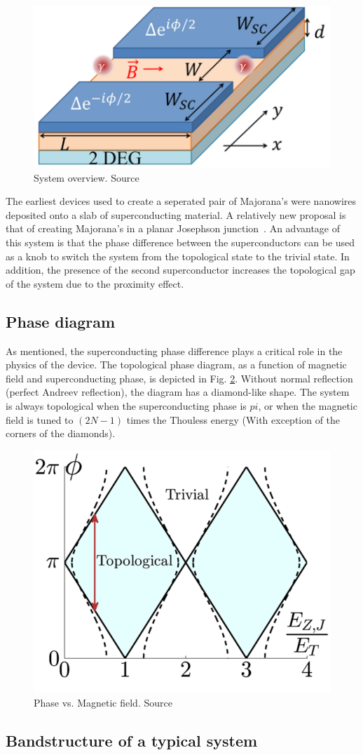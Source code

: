 	\begin{figure}[!htb]
	\centering
	\includegraphics[width=0.5\columnwidth]{figures/pientka_system}
	\caption{System overview. Source\cite{pientka_topological_2017}}
	\label{fig:pientka_system}
	\end{figure}

	The earliest devices used to create a seperated pair of Majorana's were nanowires deposited onto a slab of superconducting material.
	A relatively new proposal is that of creating Majorana's in a planar Josephson junction~\cite{pientka_topological_2017}.
	An advantage of this system is that the phase difference between the superconductors can be used as a knob to switch the system from the topological state to the trivial state. 
	In addition, the presence of the second superconductor increases the topological gap of the system due to the proximity effect.

			

	\subsection{Phase diagram}
		As mentioned, the superconducting phase difference plays a critical role in the physics of the device.
		The topological phase diagram, as a function of magnetic field and superconducting phase, is depicted in Fig. \ref{fig:pientka_phase_diagram}.
		Without normal reflection (perfect Andreev reflection), the diagram has a diamond-like shape.
		The system is always topological when the superconducting phase is $pi$, or when the magnetic field is tuned to $(2N-1)$ times the Thouless energy (With exception of the corners of the diamonds).
		
		\begin{figure}[!htb]
		\centering
		\includegraphics[width=0.5\columnwidth]{figures/pientka_phase_diagram}
		\caption{Phase vs. Magnetic field. Source\cite{pientka_topological_2017}}
		\label{fig:pientka_phase_diagram}
		\end{figure}
			
	\subsection{Bandstructure of a typical system}
